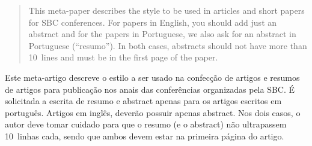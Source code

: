 \begin{abstract}
This meta-paper describes the style to be used in articles and short
papers for SBC conferences. For papers in English, you should add just
an abstract and for the papers in Portuguese, we also ask for an
abstract in Portuguese (``resumo''). In both cases, abstracts should not
have more than 10~lines and must be in the first page of the paper.
\end{abstract}

\begin{resumo}
\begin{otherlanguage}{brazilian}
Este meta-artigo descreve o estilo a ser usado na confecção de artigos
e resumos de artigos para publicação nos anais das conferências
organizadas pela SBC. É solicitada a escrita de resumo e abstract apenas
para os artigos escritos em português. Artigos em inglês, deverão
possuir apenas abstract. Nos dois casos, o autor deve tomar cuidado para
que o resumo (e o abstract) não ultrapassem 10~linhas cada, sendo que
ambos devem estar na primeira página do artigo.
\end{otherlanguage}
\end{resumo}

